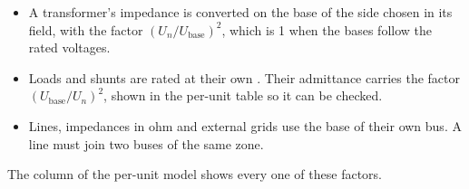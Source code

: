 \begin{itemize}
  \item A transformer's impedance is converted on the base of the side chosen in its
     field, with the factor $(U_n/U_\text{base})^2$, which is 1 when the
    bases follow the rated voltages.
  \item Loads and shunts are rated at their own . Their admittance carries
    the factor $(U_\text{base}/U_n)^2$, shown in the per-unit table so it can be checked.
  \item Lines, impedances in ohm and external grids use the base of their own bus. A line
    must join two buses of the same zone.
\end{itemize}

The  column of the per-unit model shows every one of these
factors.

